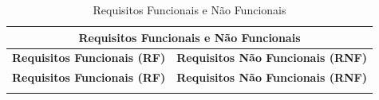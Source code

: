 \begin{longtable}{|p{6cm}|p{6cm}|}
    \caption{Requisitos Funcionais e Não Funcionais}
    \label{tab:requisitos}\\
    \hline
    \multicolumn{2}{|c|}{\textbf{Requisitos Funcionais e Não Funcionais}} \\
    
    \hline
    \textbf{Requisitos Funcionais (RF)} & \textbf{Requisitos Não Funcionais (RNF)} \\
    \hline
    \endfirsthead

    \hline
    \textbf{Requisitos Funcionais (RF)} & \textbf{Requisitos Não Funcionais (RNF)} \\
    \hline
    \endhead

    \hline
    \endfoot

    \hline
    \endlastfoot


\end{longtable}
